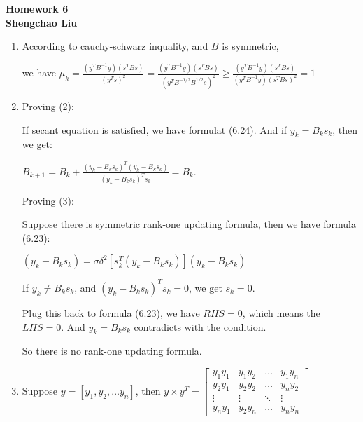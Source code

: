 \documentclass[12pt]{article}
\begin{document}
\begin{center} {\Large
{\bf Homework 6\\Shengchao Liu}}
\end{center}

\begin{enumerate}


\item


According to cauchy-schwarz inquality, and $B$ is symmetric,

we have $\mu_k = \frac{(y^TB^{-1}y)(s^TBs)}{(y^Ts)^2} = \frac{(y^TB^{-1}y)(s^TBs)}{(y^T B^{-1/2} B^{1/2}s)^2} \ge \frac{(y^TB^{-1}y)(s^TBs)}{(y^T B^{-1}y)(s^T Bs)^2} =  1 $


\bigskip

\bigskip

\bigskip


\item

Proving (2):

If secant equation is satisfied, we have formulat (6.24). And if $y_k = B_k s_k$, then we get:

$B_{k+1} = B_{k} + \frac{(y_k - B_ks_k)^T(y_k - B_ks_k)}{(y_k - B_ks_k)^Ts_k} = B_k$.

Proving (3):

Suppose there is symmetric rank-one updating formula, then we have formula (6.23):

$(y_k - B_k s_k ) = \sigma \delta^2 [ s_k^T (y_k - B_ks_k) ] (y_k - B_k s_k)$

If $y_k \neq B_k s_k$, and $(y_k - B_k s_k)^T s_k = 0$, we get $s_k = 0$.

Plug this back to formula (6.23), we have $RHS=0$, which means the $LHS=0$. And $y_k = B_k s_k$ contradicts with the condition.

So there is no rank-one updating formula.


\bigskip

\bigskip

\bigskip


\item

Suppose $y = [y_1, y_2, \hdots y_n]$, then $y \times y^T = \begin{bmatrix} y_1y_1 & y_1y_2 & \hdots & y_1 y_n \\ y_2y_1 & y_2y_2 & \hdots & y_ny_2 \\ \vdots & \vdots & \ddots & \vdots \\ y_ny_1 & y_2y_n & \hdots & y_n y_n \end{bmatrix}$


\end{enumerate}
\end{document}
